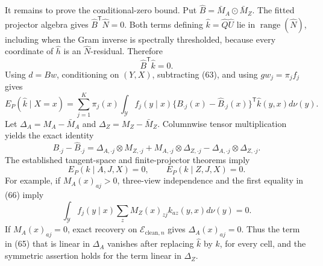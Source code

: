 It remains to prove the conditional-zero bound.  Put \(\widehat B=\bar M_A\odot\bar M_Z\).  The fitted projector algebra gives
\(\widehat B^{\mathsf T}\widehat N=0\).  Both terms defining \(\widehat k=\widehat Q\widehat U\) lie in \(\operatorname{range}(\widehat N)\), including when the Gram inverse is spectrally thresholded, because every coordinate of \(\widehat h\) is an \(\widehat N\)-residual.  Therefore
\[
 \widehat B^{\mathsf T}\widehat k=0.                            \tag{63}
\]
Using \(d=Bw\), conditioning on \((Y,X)\), subtracting (63), and using \(g w_j=\pi_jf_j\) gives
\[
 E_P(\widehat k\mid X=x)
 =\sum_{j=1}^K\pi_j(x)\int_{\mathcal Y}f_j(y\mid x)
 \{B_{\cdot j}(x)-\widehat B_{\cdot j}(x)\}^{\mathsf T}
 \widehat k(y,x)d\nu(y).                                      \tag{64}
\]
Let \(\Delta_A=M_A-\bar M_A\) and \(\Delta_Z=M_Z-\bar M_Z\).  Columnwise tensor multiplication yields the exact identity
\[
 B_{\cdot j}-\widehat B_{\cdot j}
 =\Delta_{A,\cdot j}\otimes M_{Z,\cdot j}
  +M_{A,\cdot j}\otimes\Delta_{Z,\cdot j}
  -\Delta_{A,\cdot j}\otimes\Delta_{Z,\cdot j}.               \tag{65}
\]
The established tangent-space and finite-projector theorems imply
\[
 E_P(k\mid A,J,X)=0,
 \qquad E_P(k\mid Z,J,X)=0.                                   \tag{66}
\]
For example, if \(M_A(x)_{aj}>0\), three-view independence and the first equality in (66) imply
\[
 \int_{\mathcal Y}f_j(y\mid x)
 \sum_zM_Z(x)_{zj}k_{az}(y,x)d\nu(y)=0.                        \tag{67}
\]
If \(M_A(x)_{aj}=0\), exact recovery on \(\mathcal E_{\mathrm{clean},n}\) gives \(\Delta_A(x)_{aj}=0\).  Thus the term in (65) that is linear in \(\Delta_A\) vanishes after replacing \(\widehat k\) by \(k\), for every cell, and the symmetric assertion holds for the term linear in \(\Delta_Z\).

